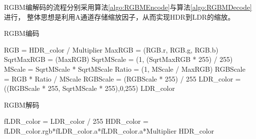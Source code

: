 RGBM编解码的流程分别采用算法\ref{algo:RGBMEncode}与算法\ref{algo:RGBMDecode}进行，
整体思想是利用A通道存储缩放因子，从而实现HDR到LDR的缩放。

\begin{algorithm}
    \caption{RGBM编码}
    \label{algo:RGBMEncode}
    {
        \Tfloat RGB = HDR\_color / Multiplier\;
        \float MaxRGB = \max(RGB.r, RGB.g, RGB.b)\;
        \float SqrtMaxRGB = \sqrt(MaxRGB)\;
        \float SqrtMScale = \min(1, \ceil(SqrtMaxRGB * 255) / 255)\;
        \float MScale = SqrtMScale * SqrtMScale\;
        \float Ratio = \min(1, MScale / MaxRGB)\;
        \Tfloat RGBScale = RGB * Ratio / MScale\;
        RGBScale = \round(RGBScale * 255) / 255\;
        \FInt LDR\_color = \clamp(\FInt(RGBScale * 255, SqrtMScale * 255),0,255)\;
        \Return LDR\_color\;
    }
\end{algorithm}
\begin{algorithm}
    \caption{RGBM解码}
    \label{algo:RGBMDecode}
    {
        \Ffloat fLDR\_color = LDR\_color / 255\;
        \Tfloat HDR\_color = fLDR\_color.rgb*fLDR\_color.a*fLDR\_color.a*Multiplier\;
        \Return HDR\_color\;
    }
\end{algorithm}

    
